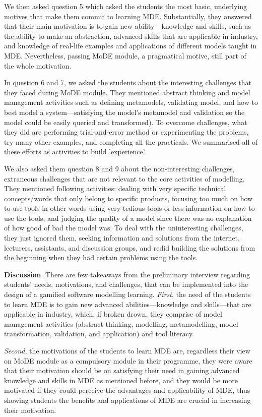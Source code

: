 \documentclass[12pt, a4paper]{report}
\begin{document}
{We then asked question 5 which asked the students the most basic, underlying motives that make them commit to learning MDE. Substantially, they answered that their main motivation is to gain new ability---knowledge and skills, such as the ability to make an abstraction, advanced skills that are applicable in industry, and knowledge of real-life examples and applications of different models taught in MDE. Nevertheless, passing MoDE module, a pragmatical motive, still part of the whole motivation. 

In question 6 and 7, we asked the students about the interesting challenges that they faced during MoDE module. They mentioned abstract thinking and model management activities such as defining metamodels, validating model, and how to best model a system---satisfying the model's metamodel and validation so the model could be easily queried and transformed). To overcome challenges, what they did are performing trial-and-error method or experimenting the problems, try many other examples, and completing all the practicals. We summarised all of these efforts as activities to build 'experience'.

We also asked them question 8 and 9 about the non-interesting challenges, extraneous challenges that are not relevant to the core activities of modelling. They mentioned following activities: dealing with very specific technical concepts/words that only belong to specific products, focusing too much on how to use tools in other words using very tedious tools or less information on how to use the tools, and judging the quality of a model since there was no explanation of how good of bad the model was. To deal with the uninteresting challenges, they just ignored them, seeking information and solutions from the internet, lecturers, assistants, and discussion groups, and redid building the solutions from the beginning when they had certain problems using the tools.

\textbf{Discussion}. There are few takeaways from the preliminary interview regarding students' needs, motivations, and challenges, that can be implemented into the design of a gamified software modelling learning. \textit{First}, the need of the students to learn MDE is to gain new advanced abilities---knowledge and skills---that are applicable in industry, which, if broken drown, they comprise of model management activities (abstract thinking, modelling, metamodelling, model transformation, validation, and application) and tool literacy. 

\textit{Second}, the motivations of the students to learn MDE are, regardless their view on MoDE module as a compulsory module in their programme, they were aware that their motivation should be on satisfying their need in gaining advanced knowledge and skills in MDE as mentioned before, and they would be more motivated if they could perceive the advantages and applicability of MDE, thus showing students the benefits and applications of MDE are crucial in increasing their motivation.

}
\end{document}
